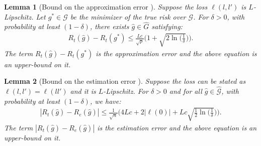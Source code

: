 \documentclass{article}
\newtheorem{lemma}{Lemma}
\begin{document}
\begin{lemma}[Bound on the approximation error {\citep[Lemma 2]{rahimi2008weighted}}]\label{lemma_RKS_approximation_error_bound}
Suppose the loss $\ell(l,l')$ is $L$-Lipschitz. Let $g^* \in \mathcal{G}$ be the minimizer of the true risk over $\mathcal{G}$.
For $\delta >0$, with probability at least $(1-\delta)$, there exists $\widehat{g} \in \widehat{G}$ satisfying:
\begin{align}
R_t(\widehat{g}) - R_t(g^*) \leq \frac{Lc}{\sqrt{p}} \Bigg(1 + \sqrt{2 \ln(\frac{1}{\delta}})\Bigg).
\end{align}
The term $R_t(\widehat{g}) - R_t(g^*)$ is the approximation error and the above equation is an upper-bound on it. 
\end{lemma}

\begin{lemma}[Bound on the estimation error {\citep[Lemma 3]{rahimi2008weighted}}]\label{lemma_RKS_estimation_error_bound}
Suppose the loss can be stated as $\ell(l,l') = \ell(l l')$ and it is $L$-Lipschitz. 
For $\delta >0$ and for all $\widehat{g} \in \widehat{\mathcal{G}}$, with probability at least $(1-\delta)$, we have:
\begin{align}\label{equation_RKS_estimation_error_bound}
|R_t(\widehat{g}) - R_e(\widehat{g})| \leq \frac{1}{\sqrt{n}} \Bigg(4Lc + 2|\ell(0)| + Lc \sqrt{\frac{1}{2} \ln(\frac{1}{\delta}})\Bigg).
\end{align}
The term $|R_t(\widehat{g}) - R_e(\widehat{g})|$ is the estimation error and the above equation is an upper-bound on it. 
\end{lemma}
\end{document}
